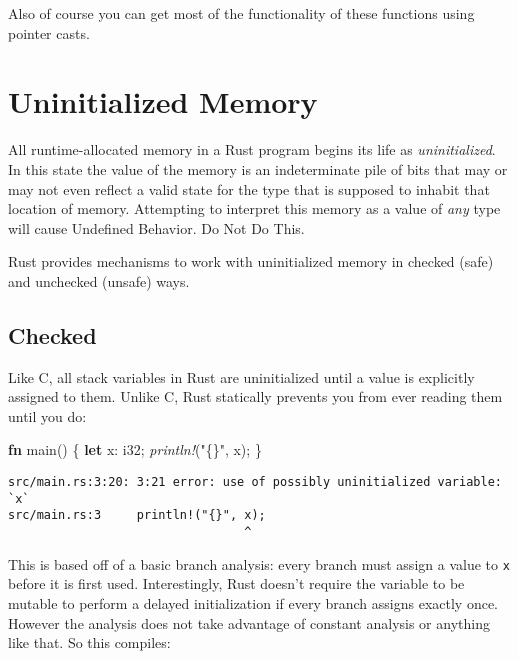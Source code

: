 \documentclass[a4paper,]{book}
\newenvironment{Shaded}{\begin{snugshade}}{\end{snugshade}}
\newcommand{\KeywordTok}[1]{\textcolor[rgb]{0.13,0.29,0.53}{\textbf{{#1}}}}
\newcommand{\DataTypeTok}[1]{\textcolor[rgb]{0.13,0.29,0.53}{{#1}}}
\newcommand{\StringTok}[1]{\textcolor[rgb]{0.31,0.60,0.02}{{#1}}}
\newcommand{\PreprocessorTok}[1]{\textcolor[rgb]{0.56,0.35,0.01}{\textit{{#1}}}}
\newcommand{\NormalTok}[1]{{#1}}
\begin{document}
Also of course you can get most of the functionality of these functions
using pointer casts.

\hypertarget{sec--uninitialized}{\chapter{Uninitialized
Memory}\label{sec--uninitialized}}

All runtime-allocated memory in a Rust program begins its life as
\emph{uninitialized}. In this state the value of the memory is an
indeterminate pile of bits that may or may not even reflect a valid
state for the type that is supposed to inhabit that location of memory.
Attempting to interpret this memory as a value of \emph{any} type will
cause Undefined Behavior. Do Not Do This.

Rust provides mechanisms to work with uninitialized memory in checked
(safe) and unchecked (unsafe) ways.

\section{Checked}\label{sec--checked-uninit}

Like C, all stack variables in Rust are uninitialized until a value is
explicitly assigned to them. Unlike C, Rust statically prevents you from
ever reading them until you do:

\begin{Shaded}
\begin{Highlighting}[]
\KeywordTok{fn} \NormalTok{main() \{}
    \KeywordTok{let} \NormalTok{x: }\DataTypeTok{i32}\NormalTok{;}
    \PreprocessorTok{println!}\NormalTok{(}\StringTok{"\{\}"}\NormalTok{, x);}
\NormalTok{\}}
\end{Highlighting}
\end{Shaded}

\begin{verbatim}
src/main.rs:3:20: 3:21 error: use of possibly uninitialized variable: `x`
src/main.rs:3     println!("{}", x);
                                 ^
\end{verbatim}

This is based off of a basic branch analysis: every branch must assign a
value to \texttt{x} before it is first used. Interestingly, Rust doesn't
require the variable to be mutable to perform a delayed initialization
if every branch assigns exactly once. However the analysis does not take
advantage of constant analysis or anything like that. So this compiles:
\end{document}
